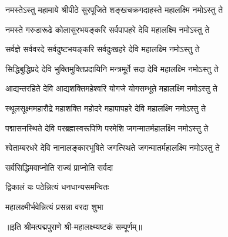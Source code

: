 
\twolineshloka
{नमस्तेऽस्तु महामाये श्रीपीठे सुरपूजिते}
{शङ्खचक्रगदाहस्ते महालक्ष्मि नमोऽस्तु ते}

\twolineshloka
{नमस्ते गरुडारूढे कोलासुरभयङ्करि}
{सर्वपापहरे देवि महालक्ष्मि नमोऽस्तु ते}

\twolineshloka
{सर्वज्ञे सर्ववरदे सर्वदुष्टभयङ्करि}
{सर्वदुःखहरे देवि महालक्ष्मि नमोऽस्तु ते}

\twolineshloka
{सिद्धिबुद्धिप्रदे देवि भुक्तिमुक्तिप्रदायिनि}
{मन्त्रमूर्ते सदा देवि महालक्ष्मि नमोऽस्तु ते}

\twolineshloka
{आद्यन्तरहिते देवि आद्यशक्तिमहेश्वरि}
{योगजे योगसम्भूते महालक्ष्मि नमोऽस्तु ते}

\twolineshloka
{स्थूलसूक्ष्ममहारौद्रे महाशक्ति महोदरे}
{महापापहरे देवि महालक्ष्मि नमोऽस्तु ते}

\twolineshloka
{पद्मासनस्थिते देवि परब्रह्मस्वरूपिणि}
{परमेशि जगन्मातर्महालक्ष्मि नमोऽस्तु ते}

\twolineshloka
{श्वेताम्बरधरे देवि नानालङ्कारभूषिते}
{जगत्स्थिते जगन्मातर्महालक्ष्मि नमोऽस्तु ते}

{सर्वसिद्धिमवाप्नोति राज्यं प्राप्नोति सर्वदा}

{द्विकालं यः पठेन्नित्यं धनधान्यसमन्वितः}

{महालक्ष्मीर्भवेन्नित्यं प्रसन्ना वरदा शुभा}

॥इति श्रीमत्पद्मपुराणे श्री-महालक्ष्म्यष्टकं सम्पूर्णम्॥